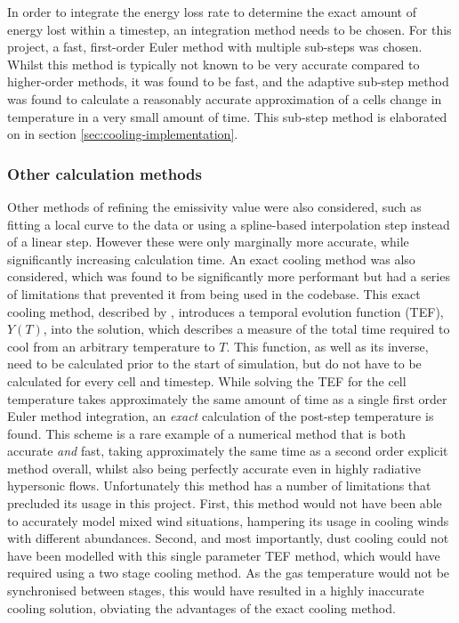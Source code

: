 In order to integrate the energy loss rate to determine the exact amount of energy lost within a timestep, an integration method needs to be chosen.
For this project, a fast, first-order Euler method with multiple sub-steps was chosen.
Whilst this method is typically not known to be very accurate compared to higher-order methods, it was found to be fast, and the adaptive sub-step method was found to calculate a reasonably accurate approximation of a cells change in temperature in a very small amount of time.
This sub-step method is elaborated on in section \ref{sec:cooling-implementation}.

\subsubsection{Other calculation methods}
\label{sec:othercalc}

Other methods of refining the emissivity value were also considered, such as fitting a local curve to the data or using a spline-based interpolation step instead of a linear step.
However these were only marginally more accurate, while significantly increasing calculation time.
An exact cooling method was also considered, which was found to be significantly more performant but had a series of limitations that prevented it from being used in the codebase.
This exact cooling method, described by \textcite{townsendExactIntegrationScheme2009}, introduces a temporal evolution function (TEF), $Y(T)$, into the solution, which describes a measure of the total time required to cool from an arbitrary temperature to $T$.
This function, as well as its inverse, need to be calculated prior to the start of simulation, but do not have to be calculated for every cell and timestep.
While solving the TEF for the cell temperature takes approximately the same amount of time as a single first order Euler method integration, an \emph{exact} calculation of the post-step temperature is found.
This scheme is a rare example of a numerical method that is both accurate \emph{and} fast, taking approximately the same time as a second order explicit method overall, whilst also being perfectly accurate even in highly radiative hypersonic flows.
Unfortunately this method has a number of limitations that precluded its usage in this project.
First, this method would not have been able to accurately model mixed wind situations, hampering its usage in cooling winds with different abundances.
Second, and most importantly, dust cooling could not have been modelled with this single parameter TEF method, which would have required using a two stage cooling method.
As the gas temperature would not be synchronised between stages, this would have resulted in a highly inaccurate cooling solution, obviating the advantages of the exact cooling method.

